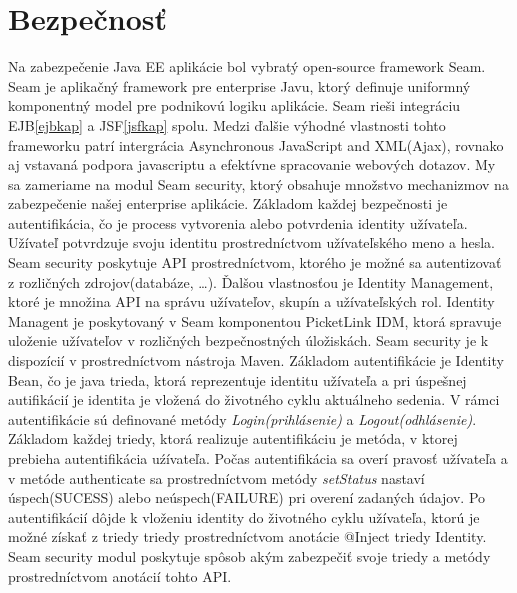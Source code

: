 \section{Bezpečnosť}
Na zabezpečenie Java EE aplikácie bol vybratý open-source framework Seam\cite{seambook}. Seam je aplikačný framework pre enterprise Javu, ktorý definuje uniformný komponentný model pre podnikovú logiku aplikácie. Seam rieši integráciu EJB\ref{ejbkap} a JSF\ref{jsfkap} spolu. Medzi ďalšie výhodné vlastnosti tohto frameworku patrí intergrácia Asynchronous JavaScript and XML(Ajax)\cite{ajaxbook}, rovnako aj vstavaná podpora javascriptu a efektívne spracovanie webových dotazov. \newline \indent My sa zameriame na modul Seam security, ktorý obsahuje množstvo mechanizmov na zabezpečenie našej enterprise aplikácie. Základom každej bezpečnosti je autentifikácia, čo je process vytvorenia alebo potvrdenia identity užívateľa. Užívateľ potvrdzuje svoju identitu prostredníctvom užívateľského meno a hesla. Seam security poskytuje API prostredníctvom, ktorého je možné sa autentizovať z rozličných zdrojov(databáze, \ldots). Ďalšou vlastnosťou je Identity Management, ktoré je množina API na správu užívateľov, skupín a užívateľských rol. Identity Managent je poskytovaný v Seam komponentou PicketLink IDM, ktorá spravuje uloženie užívateľov v rozličných bezpečnostných úložiskách. Seam security je k dispozícií v prostredníctvom nástroja Maven. \newline \indent Základom autentifikácie je Identity Bean, čo je java trieda, ktorá reprezentuje identitu užívateľa a pri úspešnej autifikácií je identita je vložená do životného cyklu aktuálneho sedenia. V rámci autentifikácie sú definované metódy \emph{Login(prihlásenie)} a \emph{Logout(odhlásenie)}. Základom každej triedy, ktorá realizuje autentifikáciu je metóda, v ktorej prebieha autentifikácia uźívateľa.
Počas autentifikácia sa overí pravosť užívateľa a v metóde authenticate sa prostredníctvom metódy \emph{setStatus}  nastaví úspech(SUCESS) alebo neúspech(FAILURE) pri overení zadaných údajov. Po autentifikácií dôjde k vloženiu identity do životného cyklu užívateľa, ktorú je možné získať z triedy triedy prostredníctvom anotácie @Inject triedy Identity. \newline \indent Seam security modul poskytuje spôsob akým zabezpečiť svoje triedy a metódy prostredníctvom anotácií tohto API.
